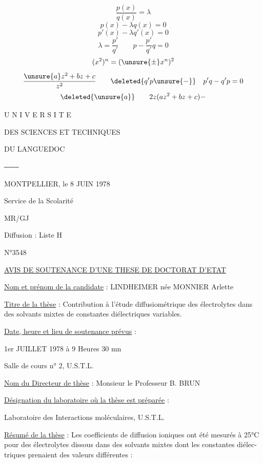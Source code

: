 \[
\frac{p(x)}{q(x)}=\lambda
\]
\[
p(x)-\lambda q(x)=0
\]
\[
p'(x)-\lambda q'(x)=0
\]
\[
\lambda=\frac{p'}{q'}\qquad p-\frac{p'}{q'}q=0
\]
\[
(x^2)^n=(\unsure{\pm}x^n)^2
\]
\[
\frac{\unsure{a}z^2+bz+c}{z^2}\qquad
\deleted{q'p\unsure{-}}\quad p'q-q'p=0
\]
\[
\deleted{\unsure{a}}\qquad 2z(az^2+bz+c)-
\]

U N I V E R S I T E

DES SCIENCES ET TECHNIQUES

DU LANGUEDOC

\texttt{------------}

MONTPELLIER, le 8 JUIN 1978

Service de la Scolarité

MR/GJ

Diffusion : Liste H

N°3548

\uline{AVIS DE SOUTENANCE D'UNE THESE DE DOCTORAT D'ETAT}

\uline{Nom et prénom de la candidate} : LINDHEIMER née MONNIER Arlette

\uline{Titre de la thèse} : Contribution à l'étude diffusiométrique des électrolytes dans
des solvants mixtes de constantes diélectriques variables.

\uline{Date, heure et lieu de soutenance prévus} :

1er JUILLET 1978 à 9 Heures 30 mn

Salle de cours n° 2, U.S.T.L.

\uline{Nom du Directeur de thèse} : Monsieur le Professeur B. BRUN

\uline{Désignation du laboratoire où la thèse est préparée} :

Laboratoire des Interactions moléculaires, U.S.T.L.

\uline{Résumé de la thèse} : Les coefficients de diffusion ioniques ont été mesurés à 25°C
pour des électrolytes dissous dans des solvants mixtes dont les constantes diélec-\\
triques prenaient des valeurs différentes :

